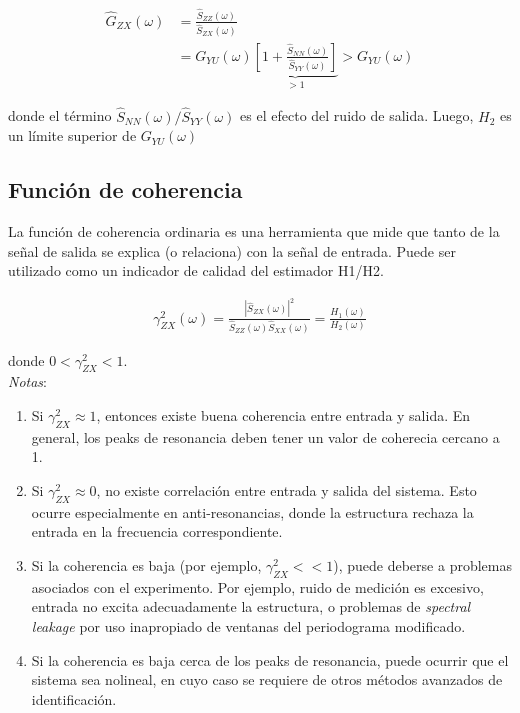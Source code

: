 \begin{align*}
    \hat{G}_{ZX}(\omega) &= \frac{\hat{S}_{ZZ}(\omega)}{\hat{S}_{ZX}(\omega)}\\
    &= G_{YU}(\omega) \underbrace{\left[1 +\frac{\hat{S}_{NN}(\omega)}{\hat{S}_{YY}(\omega)}\right]}_{> 1} > G_{YU}(\omega)
\end{align*}

donde el término $\hat{S}_{NN}(\omega)/\hat{S}_{YY}(\omega)$ es el efecto del ruido de salida. Luego, $H_2$ es un límite superior de $G_{YU}(\omega)$

\subsection{Función de coherencia}

La función de coherencia ordinaria es una herramienta que mide que tanto de la señal de salida se explica (o relaciona) con la señal de entrada. Puede ser utilizado como un indicador de calidad del estimador H1/H2.

\begin{align*}
    \gamma_{ZX}^2(\omega) = \frac{|\hat{S}_{ZX}(\omega)|^2}{\hat{S}_{ZZ}(\omega)\hat{S}_{XX}(\omega)} = \frac{H_1(\omega)}{H_2(\omega)}
\end{align*}

donde $ 0 < \gamma_{ZX}^2 < 1$.\\

\emph{Notas}:

\begin{enumerate}
    \item Si $\gamma_{ZX}^2 \approx 1$, entonces existe buena coherencia entre entrada y salida. En general, los peaks de resonancia deben tener un valor de coherecia cercano a 1.
    \item Si $\gamma_{ZX}^2 \approx 0$, no existe correlación entre entrada y salida del sistema. Esto ocurre especialmente en anti-resonancias, donde la estructura rechaza la entrada en la frecuencia correspondiente.
    \item Si la coherencia es baja (por ejemplo, $\gamma_{ZX}^2 << 1$), puede deberse a problemas asociados con el experimento. Por ejemplo,  ruido de medición es excesivo, entrada no excita adecuadamente la estructura, o problemas de \emph{spectral leakage} por uso inapropiado de ventanas del periodograma modificado.
    \item Si la coherencia es baja cerca de los peaks de resonancia, puede ocurrir que el sistema sea nolineal, en cuyo caso se requiere de otros métodos avanzados de identificación.
\end{enumerate}


